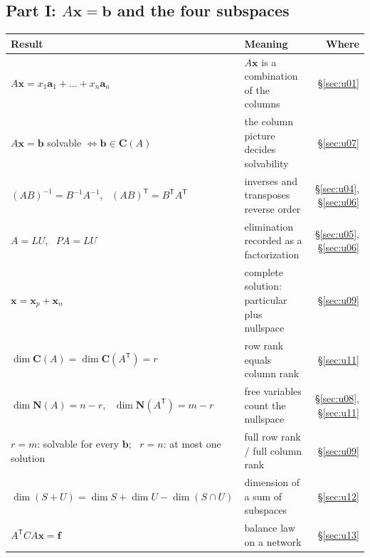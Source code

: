 \documentclass[11pt]{article}
\theoremstyle{definition}
\theoremstyle{plain}
\theoremstyle{remark}
\newcommand{\vb}[1]{\boldsymbol{#1}}          %
\newcommand{\T}{^{\mathsf{T}}}                 %
\newcommand{\Col}[1]{\mathbf{C}(#1)}            %
\newcommand{\Nul}[1]{\mathbf{N}(#1)}            %
\begin{document}
\subsection*{Part I: \texorpdfstring{$A\vb{x}=\vb{b}$}{Ax = b} and the four subspaces}
\renewcommand{\arraystretch}{1.25}
\begin{longtable}{@{}p{}p{}r@{}}
\toprule
Result & Meaning & Where \\
\midrule
$A\vb{x}=x_1\vb{a}_1+\dots+x_n\vb{a}_n$ & $A\vb{x}$ is a combination of the columns & \S\ref{sec:u01} \\
$A\vb{x}=\vb{b}$ solvable $\iff \vb{b}\in\Col{A}$ & the column picture decides solvability & \S\ref{sec:u07} \\
$(AB)^{-1}=B^{-1}A^{-1}$, \ $(AB)\T=B\T A\T$ & inverses and transposes reverse order & \S\ref{sec:u04}, \S\ref{sec:u06} \\
$A=LU$, \ $PA=LU$ & elimination recorded as a factorization & \S\ref{sec:u05}, \S\ref{sec:u06} \\
$\vb{x}=\vb{x}_p+\vb{x}_n$ & complete solution: particular plus nullspace & \S\ref{sec:u09} \\
$\dim\Col{A}=\dim\Col{A\T}=r$ & row rank equals column rank & \S\ref{sec:u11} \\
$\dim\Nul{A}=n-r$, \ $\dim\Nul{A\T}=m-r$ & free variables count the nullspace & \S\ref{sec:u08}, \S\ref{sec:u11} \\
$r=m$: solvable for every $\vb{b}$; \ $r=n$: at most one solution & full row rank / full column rank & \S\ref{sec:u09} \\
$\dim(S+U)=\dim S+\dim U-\dim(S\cap U)$ & dimension of a sum of subspaces & \S\ref{sec:u12} \\
$A\T C A\vb{x}=\vb{f}$ & balance law on a network & \S\ref{sec:u13} \\
\bottomrule
\end{longtable}
\end{document}
